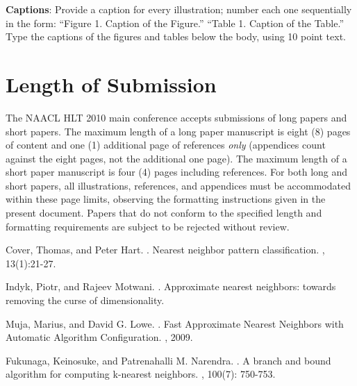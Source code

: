 \documentclass[11pt,letterpaper]{article}
\begin{document}
{\bf Captions}: Provide a caption for every illustration; number each one
sequentially in the form:  ``Figure 1. Caption of the Figure.'' ``Table 1.
Caption of the Table.''  Type the captions of the figures and 
tables below the body, using 10 point text.  

\section{Length of Submission}
\label{sec:length}

The NAACL HLT 2010 main conference accepts submissions of long papers
and short papers.  The maximum length of a long paper manuscript is
eight (8) pages of content and one (1) additional page of references
\emph{only} (appendices count against the eight pages, not the
additional one page).  The maximum length of a short paper manuscript
is four (4) pages including references.  For both long and short
papers, all illustrations, references, and appendices must be
accommodated within these page limits, observing the formatting
instructions given in the present document.  Papers that do not
conform to the specified length and formatting requirements are
subject to be rejected without review.


\begin{thebibliography}{}
 Cover, Thomas, and Peter Hart.
.
\newblock Nearest neighbor pattern classification.
, 13(1):21-27.

 Indyk, Piotr, and Rajeev Motwani.
.
\newblock Approximate nearest neighbors: towards removing the curse of dimensionality.

 Muja, Marius, and David G. Lowe.
.
\newblock Fast Approximate Nearest Neighbors with Automatic Algorithm Configuration.
, 2009.

 Fukunaga, Keinosuke, and Patrenahalli M. Narendra.
.
\newblock A branch and bound algorithm for computing k-nearest neighbors.
, 100(7): 750-753.
\end{thebibliography}
\end{document}
